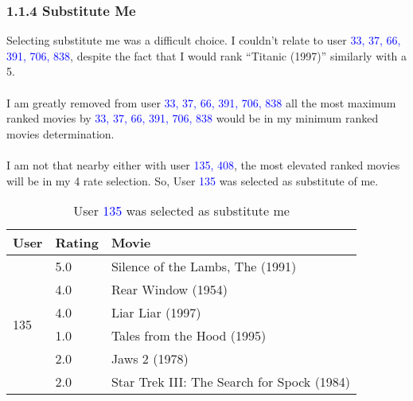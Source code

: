 \clearpage
\subsubsection{1.1.4 Substitute Me}
\vspace{2mm}
\justify
Selecting substitute me was a difficult choice. I couldn't relate to user \textcolor{blue}{33, 37, 66, 391, 706, 838}, despite the fact that I would rank \enquote{Titanic (1997)} similarly with a 5.\\
\\
I am greatly removed from user \textcolor{blue}{33, 37, 66, 391, 706, 838} all the most maximum ranked movies by \textcolor{blue}{33, 37, 66, 391, 706, 838} would be in my minimum ranked movies determination.\\
\\
I am not that nearby either with user \textcolor{blue}{135, 408}, the most elevated ranked movies will be in my 4 rate selection. So, User \textcolor{blue}{135} was selected as substitute of me. \\
\vspace{5mm}
\begin{table}[h!]
\centering
\begin{tabular}{| l | l | l |}
\hline
User & Rating & Movie \\
\hline
\multirow{6}{*}{135} & 5.0 & Silence of the Lambs, The (1991) \\
& 4.0 & Rear Window (1954)\\ 
& 4.0 & Liar Liar (1997)\\
& 1.0 & Tales from the Hood (1995)\\ 
 & 2.0 & Jaws 2 (1978)  \\ 
 & 2.0 & Star Trek III: The Search for Spock (1984)\\ \hline
\end{tabular}
\caption{User \textcolor{blue}{135} was selected as substitute me}
\label{tab:substitute}
\end{table}


